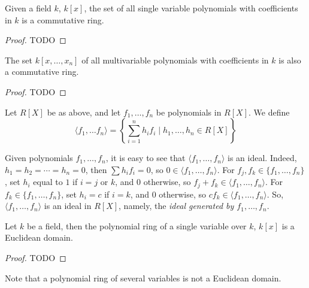 \begin{proposition}
  Given a field $k$, $k[x]$, the set of all single variable polynomials with coefficients in $k$ is a commutative ring.
\end{proposition}

\begin{proof}
  TODO
\end{proof}

\begin{proposition}
  The set $k[x, \ldots, x_n]$ of all multivariable polynomials with coefficients in $k$ is also a commutative ring.
\end{proposition}

\begin{proof}
  TODO
\end{proof}

\begin{definition}
  Let $R[X]$ be as above, and let $f_1, \ldots, f_n$ be polynomials in $R[X]$. We define
  \begin{equation*}
    \langle f_1, \ldots f_n \rangle = \left\{ \sum_{i = 1}^n h_i f_i \mid h_1, \ldots, h_n \in R[X] \right\}
  \end{equation*}
\end{definition}

Given polynomials $f_1, \ldots, f_n$, it is easy to see that $\langle f_1, \ldots, f_n \rangle$ is an ideal. Indeed, $h_1 = h_2 = \cdots = h_n = 0$, then $\sum h_i f_i = 0$, so $0 \in \langle f_1, \ldots, f_n \rangle$. For $f_j, f_k \in \{ f_1, \ldots, f_n \}$, set $h_i$ equal to $1$ if $i = j$ or $k$, and $0$ otherwise, so $f_j + f_k \in \langle f_1, \ldots, f_n \rangle$. For $f_k \in \{ f_1, \ldots, f_n \}$, set $h_i = c$ if $i = k$, and $0$ otherwise, so $c f_k \in \langle f_1, \ldots, f_n \rangle$. So, $\langle f_1, \ldots, f_n \rangle$ is an ideal in $R[X]$, namely, the \emph{ideal generated by $f_1, \ldots, f_n$}.

\begin{proposition}
  Let $k$ be a field, then the polynomial ring of a single variable over $k$, $k[x]$ is a Euclidean domain.
\end{proposition}

\begin{proof}
  TODO
\end{proof}

Note that a polynomial ring of several variables is not a Euclidean domain.

\begin{example}
  \leavevmode \\
\end{example}


